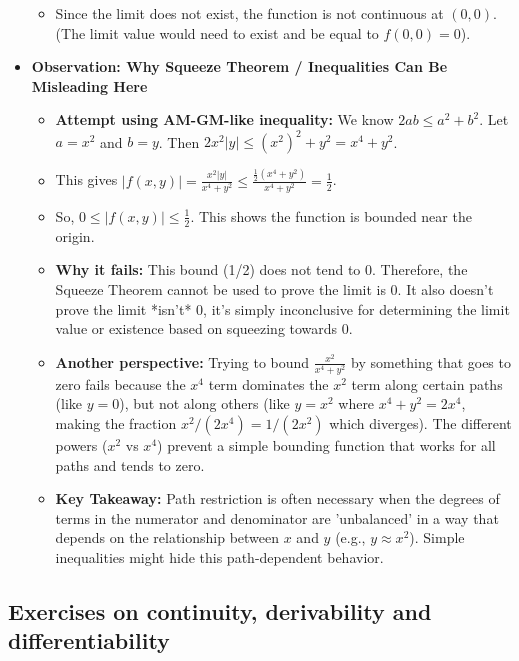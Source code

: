 \begin{cascade}
\begin{itemize}
\begin{itemize}
			      \item Since the limit does not exist, the function is not continuous at $(0,0)$. (The limit value would need to exist and be equal to $f(0,0)=0$).
		      \end{itemize}
		\item \textbf{Observation: Why Squeeze Theorem / Inequalities Can Be Misleading Here}
		      \begin{itemize}
			      \item \textbf{Attempt using AM-GM-like inequality:} We know $2ab \le a^2+b^2$. Let $a=x^2$ and $b=y$. Then $2x^2|y| \le (x^2)^2 + y^2 = x^4 + y^2$.
			      \item This gives $|f(x,y)| = \frac{x^2 |y|}{x^4 + y^2} \le \frac{\frac{1}{2}(x^4 + y^2)}{x^4 + y^2} = \frac{1}{2}$.
			      \item So, $0 \le |f(x,y)| \le \frac{1}{2}$. This shows the function is bounded near the origin.
			      \item \textbf{Why it fails:} This bound (1/2) does not tend to 0. Therefore, the Squeeze Theorem cannot be used to prove the limit is 0. It also doesn't prove the limit *isn't* 0, it's simply inconclusive for determining the limit value or existence based on squeezing towards 0.
			      \item \textbf{Another perspective:} Trying to bound $\frac{x^2}{x^4+y^2}$ by something that goes to zero fails because the $x^4$ term dominates the $x^2$ term along certain paths (like $y=0$), but not along others (like $y=x^2$ where $x^4+y^2 = 2x^4$, making the fraction $x^2/(2x^4) = 1/(2x^2)$ which diverges). The different powers ($x^2$ vs $x^4$) prevent a simple bounding function that works for all paths and tends to zero.
			      \item \textbf{Key Takeaway:} Path restriction is often necessary when the degrees of terms in the numerator and denominator are 'unbalanced' in a way that depends on the relationship between $x$ and $y$ (e.g., $y \approx x^2$). Simple inequalities might hide this path-dependent behavior.
		      \end{itemize}
	\end{itemize}
\end{cascade}

\clearpage

\subsection{Exercises on continuity, derivability and differentiability}

